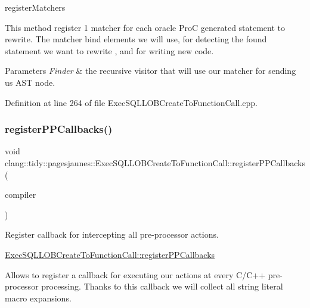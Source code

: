 register\+Matchers

This method register 1 matcher for each oracle ProC generated statement to rewrite. The matcher bind elements we will use, for detecting the found statement we want to rewrite , and for writing new code.


\begin{DoxyParams}{Parameters}
{\em Finder} & the recursive visitor that will use our matcher for sending us A\+ST node. \\
\hline
\end{DoxyParams}


Definition at line 264 of file Exec\+S\+Q\+L\+L\+O\+B\+Create\+To\+Function\+Call.\+cpp.

\mbox{\label{classclang_1_1tidy_1_1pagesjaunes_1_1_exec_s_q_l_l_o_b_create_to_function_call_ab70058c9dd8607b7ba14f9de12b37b43}} 
\subsubsection{\texorpdfstring{register\+P\+P\+Callbacks()}{registerPPCallbacks()}}
{\footnotesize\ttfamily void clang\+::tidy\+::pagesjaunes\+::\+Exec\+S\+Q\+L\+L\+O\+B\+Create\+To\+Function\+Call\+::register\+P\+P\+Callbacks (\begin{DoxyParamCaption}\item[{Compiler\+Instance \&}]{compiler }\end{DoxyParamCaption})\hspace{0.3cm}{\ttfamily [override]}}



Register callback for intercepting all pre-\/processor actions. 

\hyperlink{classclang_1_1tidy_1_1pagesjaunes_1_1_exec_s_q_l_l_o_b_create_to_function_call_ab70058c9dd8607b7ba14f9de12b37b43}{Exec\+S\+Q\+L\+L\+O\+B\+Create\+To\+Function\+Call\+::register\+P\+P\+Callbacks}

Allows to register a callback for executing our actions at every C/\+C++ pre-\/processor processing. Thanks to this callback we will collect all string literal macro expansions.


